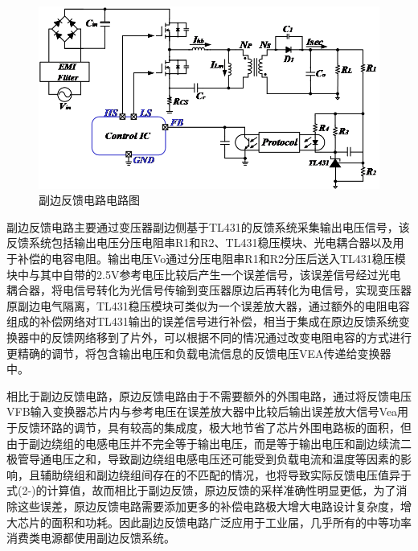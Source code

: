 \begin{figure}[htbp] 
    \centering
    \includegraphics[width=0.8\linewidth]{figures/副边反馈电路图.png}
    \caption{副边反馈电路电路图}
    \label{fig:副边反馈电路电路图}
\end{figure}

副边反馈电路主要通过变压器副边侧基于TL431的反馈系统采集输出电压信号，该反馈系统包括输出电压分压电阻串R1和R2、TL431稳压模块、光电耦合器以及用于补偿的电容电阻。输出电压Vo通过分压电阻串R1和R2分压后送入TL431稳压模块中与其中自带的2.5V参考电压比较后产生一个误差信号，该误差信号经过光电耦合器，将电信号转化为光信号传输到变压器原边后再转化为电信号，实现变压器原副边电气隔离，TL431稳压模块可类似为一个误差放大器，通过额外的电阻电容组成的补偿网络对TL431输出的误差信号进行补偿，相当于集成在原边反馈系统变换器中的反馈网络移到了片外，可以根据不同的情况通过改变电阻电容的方式进行更精确的调节，将包含输出电压和负载电流信息的反馈电压VEA传递给变换器中。

相比于副边反馈电路，原边反馈电路由于不需要额外的外围电路，通过将反馈电压VFB输入变换器芯片内与参考电压在误差放大器中比较后输出误差放大信号Vea用于反馈环路的调节，具有较高的集成度，极大地节省了芯片外围电路板的面积，但由于副边绕组的电感电压并不完全等于输出电压，而是等于输出电压和副边续流二极管导通电压之和，导致副边绕组电感电压还可能受到负载电流和温度等因素的影响，且辅助绕组和副边绕组间存在的不匹配的情况，也将导致实际反馈电压值异于式(2-)的计算值，故而相比于副边反馈，原边反馈的采样准确性明显更低，为了消除这些误差，原边反馈电路需要添加更多的补偿电路极大增大电路设计复杂度，增大芯片的面积和功耗。因此副边反馈电路广泛应用于工业届，几乎所有的中等功率消费类电源都使用副边反馈系统。



 






















